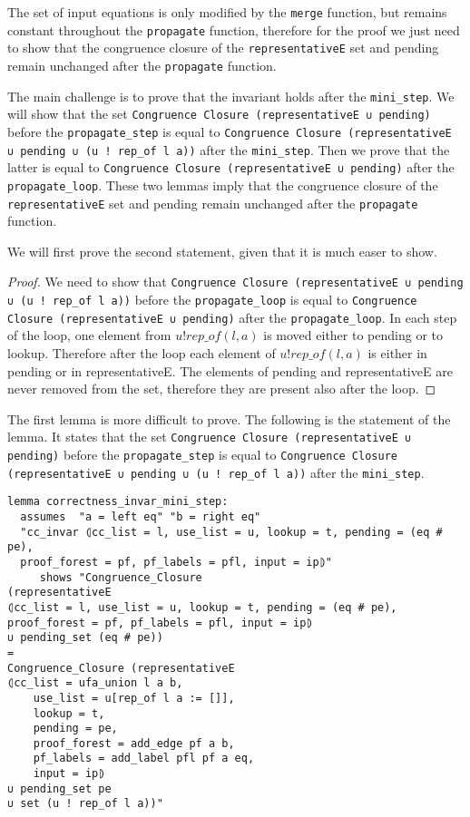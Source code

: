 The set of input equations is only modified by the \lstinline{merge} function, but remains constant throughout the \lstinline{propagate} function, therefore for the proof we just need to show that the congruence closure of the \lstinline{representativeE} set and pending remain unchanged after the \lstinline{propagate} function.

The main challenge is to prove that the invariant holds after the \lstinline{mini_step}. We will show that the set \lstinline{Congruence Closure (representativeE ∪ pending)} before the \lstinline{propagate_step} is equal to \lstinline{Congruence Closure (representativeE ∪ pending ∪ (u ! rep_of l a))} after the \lstinline{mini_step}.
Then we prove that the latter is equal to \lstinline{Congruence Closure (representativeE ∪ pending)}  after the \lstinline{propagate_loop}.
These two lemmas imply that the congruence closure of the \lstinline{representativeE} set and pending remain unchanged after the \lstinline{propagate} function.

We will first prove the second statement, given that it is much easer to show.

\begin{proof}
We need to show that \lstinline{Congruence Closure (representativeE ∪ pending ∪ (u ! rep_of l a))} before the \lstinline{propagate_loop} is equal to \lstinline{Congruence Closure (representativeE ∪ pending)}  after the \lstinline{propagate_loop}. In each step of the loop, one element from $u ! rep\_of(l, a)$ is moved either to pending or to lookup. Therefore after the loop each element of $u ! rep\_of(l, a)$ is either in pending or in representativeE. The elements of pending and representativeE are never removed from the set, therefore they are present also after the loop.
\end{proof}

The first lemma is more difficult to prove. The following is the statement of the lemma. It states that the set \lstinline{Congruence Closure (representativeE ∪ pending)} before the \lstinline{propagate_step} is equal to \lstinline{Congruence Closure (representativeE ∪ pending ∪ (u ! rep_of l a))} after the \lstinline{mini_step}.

\begin{lstlisting}[label=lst:correctness_invar_mini_step]
lemma correctness_invar_mini_step:
  assumes  "a = left eq" "b = right eq"
  "cc_invar ⦇cc_list = l, use_list = u, lookup = t, pending = (eq # pe),
  proof_forest = pf, pf_labels = pfl, input = ip⦈"
     shows "Congruence_Closure
(representativeE
⦇cc_list = l, use_list = u, lookup = t, pending = (eq # pe),
proof_forest = pf, pf_labels = pfl, input = ip⦈
∪ pending_set (eq # pe))
=
Congruence_Closure (representativeE
⦇cc_list = ufa_union l a b,
    use_list = u[rep_of l a := []],
    lookup = t,
    pending = pe,
    proof_forest = add_edge pf a b,
    pf_labels = add_label pfl pf a eq,
    input = ip⦈
∪ pending_set pe
∪ set (u ! rep_of l a))"
\end{lstlisting}

